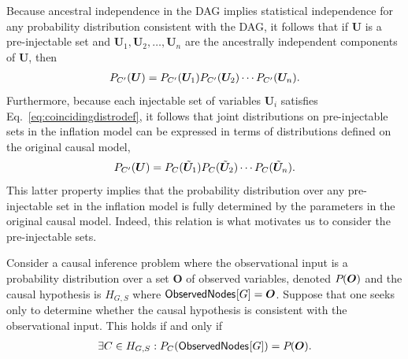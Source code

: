 Because ancestral independence in the DAG implies statistical independence for any probability distribution consistent with the DAG, it follows that  if 
$\bm{U}$ is a pre-injectable set and $\bm{U}_1,\bm{U}_2,\ldots,\bm{U}_n$ are the ancestrally independent components of $\bm{U}$, then 
\begin{align}%
\pdf[C']{\bm{U}} = \pdf[C']{\bm{U}_1} \pdf[C']{\bm{U}_2}  \cdots \pdf[C']{\bm{U}_n}.
\end{align}
Furthermore, because each injectable set of variables $\bm{U}_i$ satisfies Eq.~\eqref{eq:coincidingdistrodef}, it follows that joint distributions on pre-injectable sets in the inflation model can be expressed in terms of distributions defined on the original causal model,
\begin{align}\label{eq:preinjfactor}
\pdf[C']{\bm{U}} = \pdf[C]{\subsim{\bm{U}}_1} \pdf[C]{\subsim{\bm{U}}_2}  \cdots \pdf[C]{\subsim{\bm{U}}_n}.
\end{align}
This latter property implies that the probability distribution over any pre-injectable set in the inflation model is fully determined by the parameters in the original causal model.  Indeed, this relation is what motivates us to consider the pre-injectable sets.

Consider a causal inference problem where the observational input is a probability distribution over a set $\bm{O}$ of observed variables, denoted $\pdf{\bm{O}}$ and the causal hypothesis is $H_{G,S}$ where $\SmallNamedFunction{ObservedNodes}{G}=\bm{O}$.  Suppose that one seeks only to determine whether the causal hypothesis is consistent with the observational input.  
This holds if and only if
\begin{align}
\exists C \in H_{G,S} : \pdf[C]{\SmallNamedFunction{ObservedNodes}{G}}= \pdf{\bm{O}}.
\end{align}




